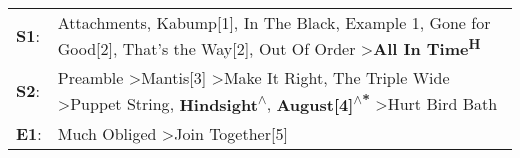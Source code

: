 \begin{supertabular}{p{0.03\textwidth}p{0.92\textwidth}}
 \textbf{S1}:  &                                                        Attachments\textsuperscript{}, \enspace Kabump[1]\textsuperscript{}, \enspace In The Black\textsuperscript{}, \enspace Example 1\textsuperscript{}, \enspace Gone for Good[2]\textsuperscript{}, \enspace That's the Way[2]\textsuperscript{}, \enspace Out Of Order\textsuperscript{} \textgreater \enspace \textbf{All In Time\textsuperscript{H}}  \enspace  \\
 \textbf{S2}:  &  Preamble\textsuperscript{} \textgreater \enspace Mantis[3]\textsuperscript{} \textgreater \enspace Make It Right\textsuperscript{}, \enspace The Triple Wide\textsuperscript{} \textgreater \enspace Puppet String\textsuperscript{}, \enspace \textbf{Hindsight\textsuperscript{$\wedge$}}, \enspace \textbf{August[4]\textsuperscript{$\wedge$*}} \textgreater \enspace Hurt Bird Bath\textsuperscript{}  \enspace  \\
 \textbf{E1}:  &                                                                                                                                                                                                                                                                                                                     Much Obliged\textsuperscript{} \textgreater \enspace Join Together[5]\textsuperscript{}  \enspace  \\
\end{supertabular}
